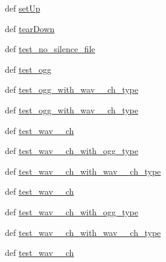 \begin{DoxyCompactItemize}
\item 
def \hyperlink{classset__noise__profile__unit__tests_1_1TestAudioProcessing_aa7eba721c2137e085d71fd1126929876}{set\-Up}
\item 
def \hyperlink{classset__noise__profile__unit__tests_1_1TestAudioProcessing_abfbcf658ea73b62d4b94016a778515f4}{tear\-Down}
\item 
def \hyperlink{classset__noise__profile__unit__tests_1_1TestAudioProcessing_a6293aff3a1f71fdcd51393ae57948a32}{test\-\_\-no\-\_\-silence\-\_\-file}
\item 
def \hyperlink{classset__noise__profile__unit__tests_1_1TestAudioProcessing_aae66bc9e72046243dd4a1cbd43a5dae5}{test\-\_\-ogg}
\item 
def \hyperlink{classset__noise__profile__unit__tests_1_1TestAudioProcessing_a9e4063805c8545ba621b7e09fba15c60}{test\-\_\-ogg\-\_\-with\-\_\-wav\-\_\-\_\-ch\-\_\-type}
\item 
def \hyperlink{classset__noise__profile__unit__tests_1_1TestAudioProcessing_a5f997de787a67b81ec5e33b8b2d23615}{test\-\_\-ogg\-\_\-with\-\_\-wav\-\_\-\_\-ch\-\_\-type}
\item 
def \hyperlink{classset__noise__profile__unit__tests_1_1TestAudioProcessing_a7b2dbff468be7478d9a1386a3bab6ac9}{test\-\_\-wav\-\_\-\_\-ch}
\item 
def \hyperlink{classset__noise__profile__unit__tests_1_1TestAudioProcessing_a72be9bf00b4fbe3248e71b8c17201f02}{test\-\_\-wav\-\_\-\_\-ch\-\_\-with\-\_\-ogg\-\_\-type}
\item 
def \hyperlink{classset__noise__profile__unit__tests_1_1TestAudioProcessing_a21bb7d6856ed95d70e3e6c5e3d7cd294}{test\-\_\-wav\-\_\-\_\-ch\-\_\-with\-\_\-wav\-\_\-\_\-ch\-\_\-type}
\item 
def \hyperlink{classset__noise__profile__unit__tests_1_1TestAudioProcessing_ae81e405165fb08eafcf2d24e524ba6d6}{test\-\_\-wav\-\_\-\_\-ch}
\item 
def \hyperlink{classset__noise__profile__unit__tests_1_1TestAudioProcessing_a7b76d128b1f1ff7e84bdbbed37deffe7}{test\-\_\-wav\-\_\-\_\-ch\-\_\-with\-\_\-ogg\-\_\-type}
\item 
def \hyperlink{classset__noise__profile__unit__tests_1_1TestAudioProcessing_a8fcca5d1c4f97bb316bbc10b252585d9}{test\-\_\-wav\-\_\-\_\-ch\-\_\-with\-\_\-wav\-\_\-\_\-ch\-\_\-type}
\item 
def \hyperlink{classset__noise__profile__unit__tests_1_1TestAudioProcessing_acd1924ca4d59275d8f8841fe43d79f67}{test\-\_\-wav\-\_\-\_\-ch}
\end{DoxyCompactItemize}
